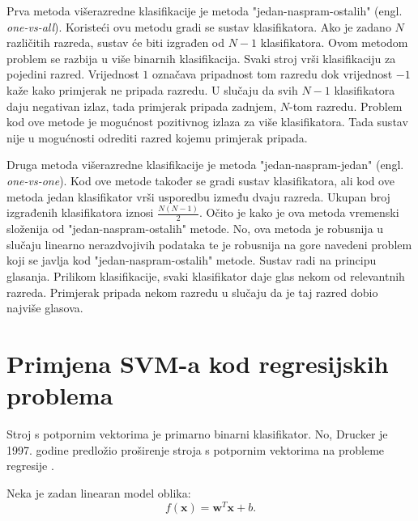 \documentclass[times, utf8, zavrsni, numeric]{fer}
\begin{document}
\par Prva metoda višerazredne klasifikacije je metoda "jedan-naspram-ostalih" (engl. \textit{one-vs-all}).
Koristeći ovu metodu gradi se sustav klasifikatora.
Ako je zadano $N$ različitih razreda, sustav će biti izgrađen od $N-1$ klasifikatora.
Ovom metodom problem se razbija u više binarnih klasifikacija.
Svaki stroj vrši klasifikaciju za pojedini razred. Vrijednost $1$ označava pripadnost tom razredu dok
vrijednost $-1$ kaže kako primjerak ne pripada razredu.
U slučaju da svih $N-1$ klasifikatora daju negativan izlaz, tada primjerak pripada zadnjem,
$N$-tom razredu. Problem kod ove metode je mogućnost pozitivnog izlaza za više klasifikatora.
Tada sustav nije u mogućnosti odrediti razred kojemu primjerak pripada.

\par Druga metoda višerazredne klasifikacije je metoda "jedan-naspram-jedan" (engl. \textit{one-vs-one}).
Kod ove metode također se gradi sustav klasifikatora, ali kod ove metoda jedan klasifikator vrši usporedbu
između dvaju razreda.
Ukupan broj izgrađenih klasifikatora iznosi $\frac{N(N - 1)}{2}$.
Očito je kako je ova metoda vremenski složenija od "jedan-naspram-ostalih" metode. 
No, ova metoda je robusnija u slučaju linearno nerazdvojivih podataka te je robusnija na gore navedeni 
problem koji se javlja kod "jedan-naspram-ostalih" metode.
Sustav radi na principu glasanja. 
Prilikom klasifikacije, svaki klasifikator daje glas nekom od relevantnih razreda. 
Primjerak pripada nekom razredu u slučaju da je taj razred dobio najviše glasova.

\section{Primjena SVM-a kod regresijskih problema} \label{sec:svr}
Stroj s potpornim vektorima je primarno binarni klasifikator. 
No, Drucker je 1997. godine predložio proširenje stroja s potpornim vektorima na 
probleme regresije \cite{Drucker97supportvector}.

\par Neka je zadan linearan model oblika:
\begin{equation}
  f(\mathbf{x}) = \mathbf{w}^T\mathbf{x} + b. 
\end{equation}
\end{document}
